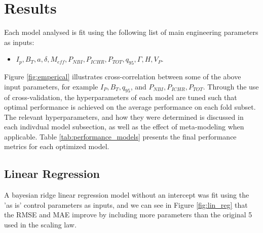 \documentclass[a4paper, twoside, final, 12pt]{article}
\begin{document}
\section{Results}{\label{sec:results_1}
Each model analysed is fit using the following list of main engineering parameters as inputs:
\begin{itemize}
        \item $I_p, B_T, a, \delta, M_{eff}, P_{NBI}, P_{ICHR}, P_{TOT}, q_{95}, \Gamma, H, V_P$.
\end{itemize}
Figure \ref{fig:emperical} illustrates cross-correlation between some of the above input parameters, for example $I_P, B_T, q_{95}$, and $P_{NBI}, P_{ICHR}, P_{TOT}$. 
Through the use of cross-validation, the hyperparameters of each model are tuned such that optimal performance is achieved on the average performance on each fold subset.
The relevant hyperparameters, and how they were determined is discussed in each indivdual model subsection, as well as the effect of meta-modeling when applicable.
Table \ref{tab:performance_models} presents the final performance metrics for each optimized model. 

\subsection{Linear Regression}
A bayesian ridge linear regression model without an intercept was fit using the 'as is' control parameters as inputs, and we can see in Figure \ref{fig:lin_reg} that the RMSE and MAE improve by including more parameters than the original 5 used in the scaling law.

}
\end{document}
